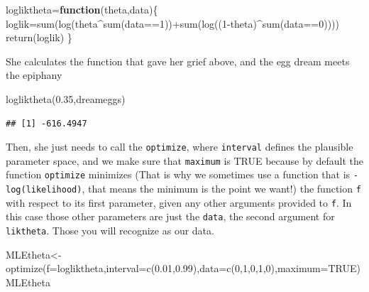 \documentclass[
]{book}
\newenvironment{Shaded}{\begin{snugshade}}{\end{snugshade}}
\newcommand{\AttributeTok}[1]{\textcolor[rgb]{0.77,0.63,0.00}{#1}}
\newcommand{\ConstantTok}[1]{\textcolor[rgb]{0.00,0.00,0.00}{#1}}
\newcommand{\ControlFlowTok}[1]{\textcolor[rgb]{0.13,0.29,0.53}{\textbf{#1}}}
\newcommand{\DecValTok}[1]{\textcolor[rgb]{0.00,0.00,0.81}{#1}}
\newcommand{\FloatTok}[1]{\textcolor[rgb]{0.00,0.00,0.81}{#1}}
\newcommand{\FunctionTok}[1]{\textcolor[rgb]{0.00,0.00,0.00}{#1}}
\newcommand{\NormalTok}[1]{#1}
\newcommand{\OtherTok}[1]{\textcolor[rgb]{0.56,0.35,0.01}{#1}}
\newcommand{\SpecialCharTok}[1]{\textcolor[rgb]{0.00,0.00,0.00}{#1}}
\begin{document}
\begin{Shaded}
\begin{Highlighting}[]
\NormalTok{logliktheta}\OtherTok{=}\ControlFlowTok{function}\NormalTok{(theta,data)\{}
\NormalTok{  loglik}\OtherTok{=}\FunctionTok{sum}\NormalTok{(}\FunctionTok{log}\NormalTok{(theta}\SpecialCharTok{\^{}}\FunctionTok{sum}\NormalTok{(data}\SpecialCharTok{==}\DecValTok{1}\NormalTok{))}\SpecialCharTok{+}\FunctionTok{sum}\NormalTok{(}\FunctionTok{log}\NormalTok{((}\DecValTok{1}\SpecialCharTok{{-}}\NormalTok{theta)}\SpecialCharTok{\^{}}\FunctionTok{sum}\NormalTok{(data}\SpecialCharTok{==}\DecValTok{0}\NormalTok{))))}
  \FunctionTok{return}\NormalTok{(loglik)}
\NormalTok{\}}
\end{Highlighting}
\end{Shaded}

She calculates the function that gave her grief above, and the egg dream meets the epiphany

\begin{Shaded}
\begin{Highlighting}[]
\FunctionTok{logliktheta}\NormalTok{(}\FloatTok{0.35}\NormalTok{,dreameggs)}
\end{Highlighting}
\end{Shaded}

\begin{verbatim}
## [1] -616.4947
\end{verbatim}

Then, she just needs to call the \texttt{optimize}, where \texttt{interval} defines the plausible parameter space, and we make sure that \texttt{maximum} is TRUE because by default the function \texttt{optimize} minimizes (That is why we sometimes use a function that is \texttt{-log(likelihood)}, that means the minimum is the point we want!) the function \texttt{f} with respect to its first parameter, given any other arguments provided to \texttt{f}. In this case those other parameters are just the \texttt{data}, the second argument for \texttt{liktheta}. Those you will recognize as our data.

\begin{Shaded}
\begin{Highlighting}[]
\NormalTok{MLEtheta}\OtherTok{\textless{}{-}}\FunctionTok{optimize}\NormalTok{(}\AttributeTok{f=}\NormalTok{logliktheta,}\AttributeTok{interval=}\FunctionTok{c}\NormalTok{(}\FloatTok{0.01}\NormalTok{,}\FloatTok{0.99}\NormalTok{),}\AttributeTok{data=}\FunctionTok{c}\NormalTok{(}\DecValTok{0}\NormalTok{,}\DecValTok{1}\NormalTok{,}\DecValTok{0}\NormalTok{,}\DecValTok{1}\NormalTok{,}\DecValTok{0}\NormalTok{),}\AttributeTok{maximum=}\ConstantTok{TRUE}\NormalTok{)}
\NormalTok{MLEtheta}
\end{Highlighting}
\end{Shaded}
\end{document}
